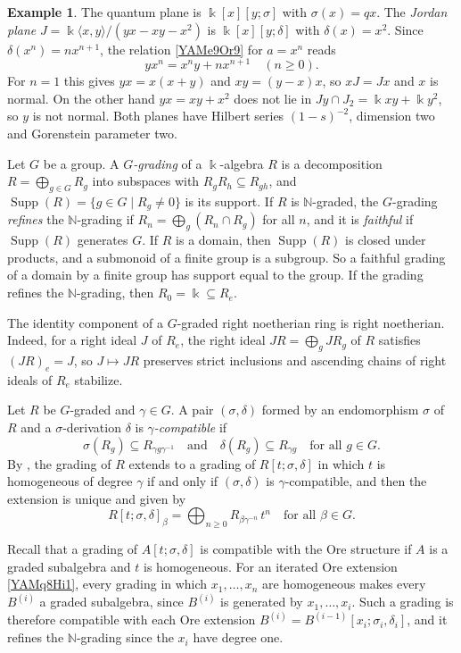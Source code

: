 \documentclass[reqno]{amsart}
\numberwithin{equation}{section}
\theoremstyle{definition}
\newtheorem{example}[equation]{Example}
\theoremstyle{remark}
\theoremstyle{plain}
\newcommand{\kk}{\Bbbk}
\DeclareMathOperator{\supp}{Supp}
\begin{document}
\begin{example}\label{YAMx2Oe1}
The quantum plane is $\kk[x][y;\sigma]$ with $\sigma(x)=qx$. The \emph{Jordan plane} $J=\kk\langle x,y\rangle/(yx-xy-x^2)$ is $\kk[x][y;\delta]$ with $\delta(x)=x^2$. Since $\delta(x^n)=nx^{n+1}$, the relation \eqref{YAMe9Or9} for $a=x^n$ reads
\[
yx^n=x^ny+nx^{n+1}\quad(n\ge0).
\]
For $n=1$ this gives $yx=x(x+y)$ and $xy=(y-x)x$, so $xJ=Jx$ and $x$ is normal. On the other hand $yx=xy+x^2$ does not lie in $Jy\cap J_2=\kk xy+\kk y^2$, so $y$ is not normal. Both planes have Hilbert series $(1-s)^{-2}$, dimension two and Gorenstein parameter two.
\end{example}

Let $G$ be a group. A \emph{$G$-grading} of a $\kk$-algebra $R$ is a decomposition $R=\bigoplus_{g\in G}R_g$ into subspaces with $R_gR_h\subseteq R_{gh}$, and $\supp(R)=\{g\in G\mid R_g\neq0\}$ is its support. If $R$ is $\mathbb N$-graded, the $G$-grading \emph{refines} the $\mathbb N$-grading if $R_n=\bigoplus_g(R_n\cap R_g)$ for all $n$, and it is \emph{faithful} if $\supp(R)$ generates $G$. If $R$ is a domain, then $\supp(R)$ is closed under products, and a submonoid of a finite group is a subgroup. So a faithful grading of a domain by a finite group has support equal to the group. If the grading refines the $\mathbb N$-grading, then $R_0=\kk\subseteq R_e$.

The identity component of a $G$-graded right noetherian ring is right noetherian. Indeed, for a right ideal $J$ of $R_e$, the right ideal $JR=\bigoplus_gJR_g$ of $R$ satisfies $(JR)_e=J$, so $J\mapsto JR$ preserves strict inclusions and ascending chains of right ideals of $R_e$ stabilize.

Let $R$ be $G$-graded and $\gamma\in G$. A pair $(\sigma,\delta)$ formed by an endomorphism $\sigma$ of $R$ and a $\sigma$-derivation $\delta$ is \emph{$\gamma$-compatible} if
\begin{equation}\label{YAMg6Tw1}
\sigma(R_g)\subseteq R_{\gamma g\gamma^{-1}}\quad\text{and}\quad\delta(R_g)\subseteq R_{\gamma g}\quad\text{for all }g\in G.
\end{equation}
By \cite[Theorem A]{AM2}, the grading of $R$ extends to a grading of $R[t;\sigma,\delta]$ in which $t$ is homogeneous of degree $\gamma$ if and only if $(\sigma,\delta)$ is $\gamma$-compatible, and then the extension is unique and given by
\[
R[t;\sigma,\delta]_\beta=\bigoplus_{n\ge0}R_{\beta\gamma^{-n}}\,t^n\quad\text{for all }\beta\in G.
\]


Recall that a grading of $A[t;\sigma,\delta]$ is compatible with the Ore structure if $A$ is a graded subalgebra and $t$ is homogeneous. For an iterated Ore extension \eqref{YAMq8Hi1}, every grading in which $x_1,\dots,x_n$ are homogeneous makes every $B^{(i)}$ a graded subalgebra, since $B^{(i)}$ is generated by $x_1,\dots,x_i$. Such a grading is therefore compatible with each Ore extension $B^{(i)}=B^{(i-1)}[x_i;\sigma_i,\delta_i]$, and it refines the $\mathbb N$-grading since the $x_i$ have degree one.
\end{document}
